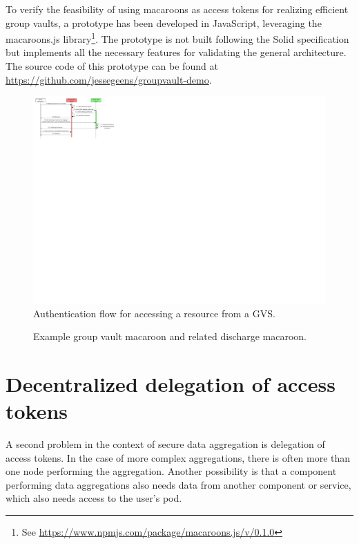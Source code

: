 To verify the feasibility of using macaroons as access tokens for realizing efficient group vaults, a prototype has been developed in JavaScript, leveraging the macaroons.js library\footnote{See \url{https://www.npmjs.com/package/macaroons.js/v/0.1.0}}. The prototype is not built following the Solid specification but implements all the necessary features for validating the general architecture. The source code of this prototype can be found at \url{https://github.com/jessegeens/groupvault-demo}.


\begin{figure}[h]
    \centering
    \includegraphics[width=1.0\textwidth]{images/macaroons-solid/InteractionDiagram-Group-Vault-Authentication-Flow.pdf}
    \caption{Authentication flow for accessing a resource from a \acrlong{GVS}.}
    \label{fig:gv-macaroon-flow}
\end{figure}

\begin{figure}[H]
    \centering
    
    \caption{Example group vault macaroon and related discharge macaroon.}
    \label{fig:gv-macaroon-example}
\end{figure}

\section{Decentralized delegation of access tokens}
\label{sec:decentralized-delegation}
A second problem in the context of secure data aggregation is delegation of access tokens. In the case of more complex aggregations, there is often more than one node performing the aggregation. Another possibility is that a component performing data aggregations also needs data from another component or service, which also needs access to the user's pod. 

